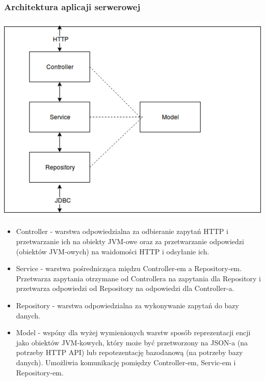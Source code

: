 \documentclass[polish,12pt]{aghthesis}
\begin{document}
\subsubsection{Architektura aplicaji serwerowej}
\includegraphics[width=\textwidth]{backedn-schema}
\begin{itemize}
    \item Controller - warstwa odpowiedzialna za odbieranie zapytań HTTP i przetwarzanie ich na obiekty JVM-owe oraz za przetwarzanie odpowiedzi (obiektów JVM-owych) na waidomości HTTP i odsyłanie ich.
    \item Service - warstwa pośrednicząca międzu Controller-em a Repository-em. Przetwarza zapytania otrzymane od Controllera na zapytania dla Repository i przetwarza odpowiedzi od Repository na odpowiedzi dla Controller-a.
    \item Repository - warstwa odpowiedzialna za wykonywanie zapytań do bazy danych.
    \item Model - wspóny dla wyżej wymienionych warstw sposób reprezentacji encji jako obiektów JVM-kowych, który może być przetworzony na JSON-a (na potrzeby HTTP API) lub repotezentację bazodanową (na potrzeby bazy danych). Umożliwia komunikację pomiędzy Controller-em, Servic-em i Repository-em.
\end{itemize}
\end{document}
